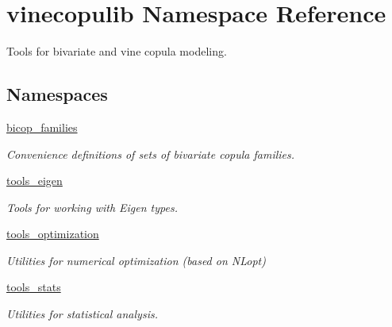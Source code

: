 \hypertarget{namespacevinecopulib}{\section{vinecopulib Namespace Reference}
\label{namespacevinecopulib}
}


Tools for bivariate and vine copula modeling.  


\subsection*{Namespaces}
\begin{DoxyCompactItemize}
\item 
 \hyperlink{namespacevinecopulib_1_1bicop__families}{bicop\+\_\+families}
\begin{DoxyCompactList}\small\item\em Convenience definitions of sets of bivariate copula families. \end{DoxyCompactList}\item 
 \hyperlink{namespacevinecopulib_1_1tools__eigen}{tools\+\_\+eigen}
\begin{DoxyCompactList}\small\item\em Tools for working with Eigen types. \end{DoxyCompactList}\item 
 \hyperlink{namespacevinecopulib_1_1tools__optimization}{tools\+\_\+optimization}
\begin{DoxyCompactList}\small\item\em Utilities for numerical optimization (based on N\+Lopt) \end{DoxyCompactList}\item 
 \hyperlink{namespacevinecopulib_1_1tools__stats}{tools\+\_\+stats}
\begin{DoxyCompactList}\small\item\em Utilities for statistical analysis. \end{DoxyCompactList}\end{DoxyCompactItemize}
